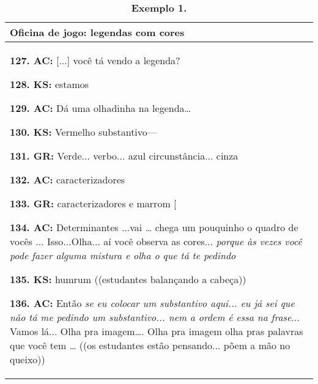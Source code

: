 \begin{table}[!htpb]
\centering
\small
	\begin{threeparttable}
		\caption*{\textbf{Exemplo 1.}}
		\label{tab-02}
		\begin{tabular}[]{@{} 
				>{\raggedright\arraybackslash}p{}@{}}
			\toprule\noalign{}
			Oficina de jogo: legendas com cores 
			\\
			\midrule\noalign{}
			
			\textbf{127. AC:} {[}...{]} você tá vendo a legenda?
			
			\textbf{128. KS:} estamos
			
			\textbf{129. AC:} Dá uma olhadinha na legenda\ldots{}
			
			\textbf{130. KS:} Vermelho substantivo---
			
			\textbf{131. GR:} Verde... verbo... azul circunstância... cinza
			
			\textbf{132. AC:} caracterizadores
			
			\textbf{133. GR:} caracterizadores e marrom {[}
			
			\textbf{134. AC:} Determinantes ...vai \ldots{} chega um pouquinho o
			quadro de vocês ... Isso...Olha... aí você observa as cores... \emph{porque
				\emph{às vezes você pode fazer alguma mistura e olha o que tá te
					pedindo}}
			
			\textbf{135. KS: }humrum\textbf{ }((estudantes balançando a cabeça))
			
			\textbf{136. AC: }Então \emph{se eu colocar um substantivo aqui... eu já
					sei que não tá me pedindo um substantivo... nem a ordem é essa na
					frase}... Vamos lá... Olha pra imagem\ldots. Olha pra imagem olha pras
			palavras que você tem \ldots{} ((os estudantes estão pensando... põem a
			mão no queixo)) \label{anchor-7}{} \\
			\bottomrule
		\end{tabular}
	\end{threeparttable}
\end{table}
